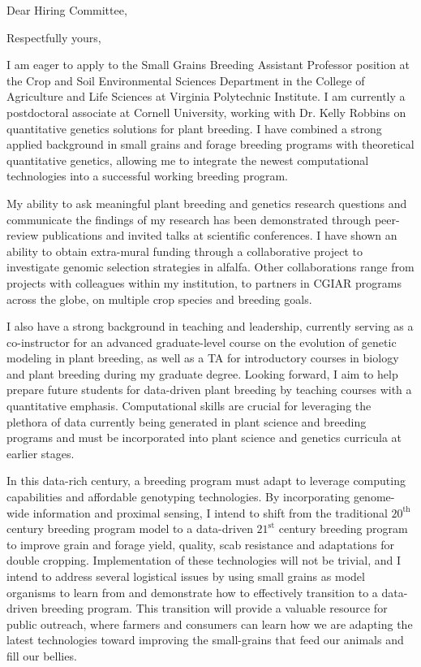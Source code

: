 \documentclass[11pt, letterpaper]{moderncv}
\begin{document}
\date{\today}
\opening{Dear Hiring Committee,}
\closing{Respectfully yours,}
\makelettertitle

I am eager to apply to the Small Grains Breeding Assistant Professor position at the Crop and Soil Environmental Sciences Department in the College of Agriculture and Life Sciences at Virginia Polytechnic Institute. I am currently a postdoctoral associate at Cornell University, working with Dr. Kelly Robbins on quantitative genetics solutions for plant breeding. I have combined a strong applied background in small grains and forage breeding programs with theoretical quantitative genetics, allowing me to integrate the newest computational technologies into a successful working breeding program.


My ability to ask meaningful plant breeding and genetics research questions and communicate the findings of my research has been demonstrated through peer-review publications and invited talks at scientific conferences. I have shown an ability to obtain extra-mural funding through a collaborative project to investigate genomic selection strategies in alfalfa. Other collaborations range from projects with colleagues within my institution, to partners in CGIAR programs across the globe, on multiple crop species and breeding goals. 

I also have a strong background in teaching and leadership, currently serving as a co-instructor for an advanced graduate-level course on the evolution of genetic modeling in plant breeding, as well as a TA for introductory courses in biology and plant breeding during my graduate degree. Looking forward, I aim to help prepare future students for data-driven plant breeding by teaching courses with a quantitative emphasis. Computational skills are crucial for leveraging the plethora of data currently being generated in plant science and breeding programs and must be incorporated into plant science and genetics curricula at earlier stages. 


In this data-rich century, a breeding program must adapt to leverage computing capabilities and affordable genotyping technologies. By incorporating genome-wide information and proximal sensing, I intend to shift from the traditional $20^\text{th}$ century breeding program model to a data-driven $21^\text{st}$ century breeding program to improve grain and forage yield, quality, scab resistance and adaptations for double cropping. Implementation of these technologies will not be trivial, and I intend to address several logistical issues by using small grains as model organisms to learn from and demonstrate how to effectively transition to a data-driven breeding program. This transition will provide a valuable resource for public outreach, where farmers and consumers can learn how we are adapting the latest technologies toward improving the small-grains that feed our animals and fill our bellies.
\end{document}
